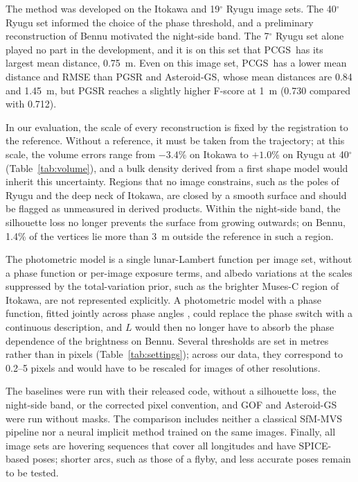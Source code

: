 \documentclass[fleqn,usenatbib]{aa}
\newcommand{\pcgs}{PCGS}
\begin{document}
The method was developed on the Itokawa and 19$^\circ$ Ryugu image sets. The 40$^\circ$ Ryugu set informed the choice
of the phase threshold, and a preliminary reconstruction of Bennu motivated the night-side band. The 7$^\circ$ Ryugu set alone played no part in the development, and it is on this set that \pcgs\ has its largest
mean distance, 0.75~m. Even on this
image set, \pcgs\ has a lower mean distance and RMSE than PGSR and Asteroid-GS, whose mean distances are 0.84 and
1.45~m, but PGSR reaches a slightly higher F-score at 1~m (0.730 compared with 0.712).

In our evaluation, the scale of every reconstruction is fixed by the registration to the reference. Without a
reference, it must be taken from the trajectory; at this scale, the volume errors range from $-3.4$\% on Itokawa to
$+1.0$\% on Ryugu at 40$^\circ$ (Table~\ref{tab:volume}), and a bulk density derived from a first shape model would
inherit this uncertainty. Regions that no image constrains, such as the poles of Ryugu and the deep neck of Itokawa, are closed
by a smooth surface and should be flagged as unmeasured in derived products. Within the night-side band, the
silhouette loss no longer prevents the surface from growing outwards; on Bennu, 1.4\% of the vertices lie more than
3~m outside the reference in such a region.

The photometric model is a single lunar-Lambert function per image set, without a phase function or per-image exposure
terms, and albedo variations at the scales suppressed by the total-variation prior, such as the brighter Muses-C region
of Itokawa, are not represented explicitly. A photometric model with a phase function, fitted jointly across phase
angles \citep{Hapke2012}, could replace the phase switch with a continuous description, and $L$ would then no longer
have to absorb the phase dependence of the brightness on Bennu. Several thresholds are set in metres rather than in
pixels (Table~\ref{tab:settings}); across our data, they correspond to 0.2--5 pixels and would have to be rescaled for images of other resolutions.

The baselines were run with their released code, without a silhouette loss, the
night-side band, or the corrected pixel convention, and GOF and Asteroid-GS were run without masks. The comparison
includes neither a classical SfM-MVS pipeline \citep{Furukawa2010,Schonberger2016MVS} nor a neural implicit method
trained on the same images. Finally, all image sets are hovering sequences that cover all longitudes and have
SPICE-based poses; shorter arcs, such as those of a flyby, and less accurate poses remain to be tested.
\end{document}
